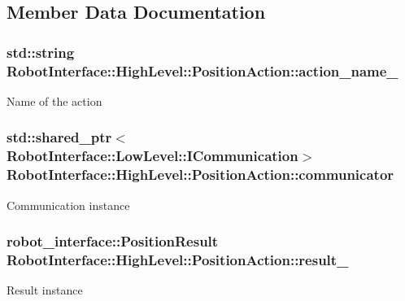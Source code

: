 \subsection{Member Data Documentation}
\subsubsection[{\texorpdfstring{action\+\_\+name\+\_\+}{action_name_}}]{\setlength{\rightskip}{0pt plus 5cm}std\+::string Robot\+Interface\+::\+High\+Level\+::\+Position\+Action\+::action\+\_\+name\+\_\+\hspace{0.3cm}{\ttfamily [protected]}}\hypertarget{classRobotInterface_1_1HighLevel_1_1PositionAction_af72be4d4f22d1beec53f70c8b56d714c}{}\label{classRobotInterface_1_1HighLevel_1_1PositionAction_af72be4d4f22d1beec53f70c8b56d714c}
Name of the action 
\subsubsection[{\texorpdfstring{communicator}{communicator}}]{\setlength{\rightskip}{0pt plus 5cm}std\+::shared\+\_\+ptr$<${\bf Robot\+Interface\+::\+Low\+Level\+::\+I\+Communication}$>$ Robot\+Interface\+::\+High\+Level\+::\+Position\+Action\+::communicator\hspace{0.3cm}{\ttfamily [protected]}}\hypertarget{classRobotInterface_1_1HighLevel_1_1PositionAction_a0b8e6a4a7f889214b4e4b69f566268c6}{}\label{classRobotInterface_1_1HighLevel_1_1PositionAction_a0b8e6a4a7f889214b4e4b69f566268c6}
Communication instance 
\subsubsection[{\texorpdfstring{result\+\_\+}{result_}}]{\setlength{\rightskip}{0pt plus 5cm}robot\+\_\+interface\+::\+Position\+Result Robot\+Interface\+::\+High\+Level\+::\+Position\+Action\+::result\+\_\+\hspace{0.3cm}{\ttfamily [protected]}}\hypertarget{classRobotInterface_1_1HighLevel_1_1PositionAction_af6ed333fa76b5f122640358b3d84b3cc}{}\label{classRobotInterface_1_1HighLevel_1_1PositionAction_af6ed333fa76b5f122640358b3d84b3cc}
Result instance 

